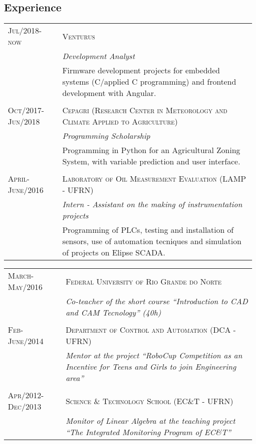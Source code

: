 \documentclass[a4paper,10pt]{article}
\begin{document}
\begin{flushleft}
\section{Experience}
\begin{tabular}{R{3cm}|p{11cm}}
\textsc{Jul/2018-now} & \textsc{Venturus} \\ & \emph{Development Analyst} \\ & Firmware development projects for embedded systems (C/applied C programming) and frontend development with Angular. \\ \\
 \textsc{Oct/2017-Jun/2018} & \textsc{Cepagri (Research Center in Meteorology and Climate Applied to Agriculture)} \\ & \emph{Programming Scholarship} \\ & Programming in Python for an Agricultural Zoning System, with variable prediction and user interface. \\ \\
 \textsc{April-June/2016} & \textsc{Laboratory of Oil Measurement Evaluation (LAMP - UFRN)} \\&\emph{Intern - Assistant on the making of instrumentation projects} \\& Programming of PLCs, testing and installation of sensors, use of automation tecniques and simulation of projects on Elipse SCADA.
 \end{tabular}

\begin{tabular}{R{3cm}|p{11cm}}
 \textsc{March-May/2016} & \textsc{Federal University of Rio Grande do Norte} \\&\emph{Co-teacher of the short course “Introduction to CAD and CAM Tecnology” (40h)}\\ \\
\textsc{Feb-June/2014} & \textsc{Department of Control and Automation (DCA - UFRN)} \\& \emph{Mentor at the project “RoboCup Competition as an Incentive for Teens and Girls to join Engineering area”} \\  \\
\textsc{Apr/2012-Dec/2013} & \textsc{Science \& Technology School (EC\&T - UFRN)} \\ & \emph{Monitor of Linear Algebra at the teaching project “The Integrated Monitoring Program of EC\&T”}
\end{tabular}






\end{flushleft}
\end{document}
